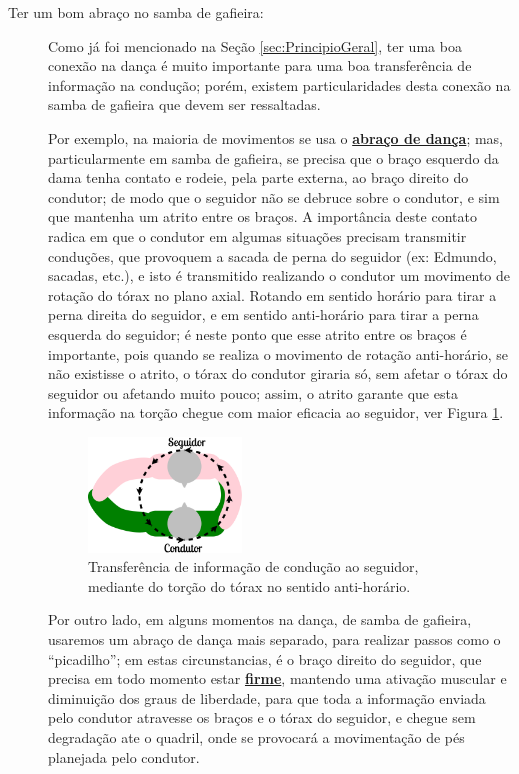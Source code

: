 \begin{description}
\item[Ter um bom abraço no samba de gafieira:] Como já foi mencionado na Seção \ref{sec:PrincipioGeral}, 
ter uma boa conexão na dança é muito importante para uma boa transferência de informação na condução; 
porém, existem particularidades desta conexão na samba de gafieira que devem ser ressaltadas.

Por exemplo, na maioria de movimentos se usa o \hyperref[def:abracodedanca]{\textbf{abraço de dança}};
mas, particularmente em samba de gafieira, se precisa que o braço esquerdo da dama tenha contato
e rodeie, pela parte externa, ao braço direito do condutor; 
de modo  que o seguidor não se debruce sobre o condutor,
e sim que mantenha um atrito entre os braços.
A importância deste contato radica em que o condutor em algumas situações precisam transmitir conduções, 
que provoquem a sacada de perna do seguidor (ex: Edmundo, sacadas, etc.), 
e isto é transmitido realizando o condutor um movimento de rotação do tórax no plano axial.  
Rotando em sentido horário para tirar a perna direita do seguidor, 
e em sentido anti-horário para tirar a perna esquerda do seguidor;
é neste ponto que esse atrito entre os braços é importante, 
pois quando se realiza o movimento de rotação anti-horário, se não existisse o atrito,
o tórax do condutor giraria só, sem afetar o tórax do seguidor ou afetando muito pouco;
assim, o atrito garante que esta informação na torção chegue com maior eficacia ao seguidor,
ver Figura \ref{fig:torcao-abraco}.
\begin{figure}[h]
  \centering
    \includegraphics[width=0.4\textwidth]{chapters/cap-normas/torcao-abraco.eps}
\caption{Transferência de informação de condução ao seguidor, mediante do torção do tórax no sentido anti-horário.}
\label{fig:torcao-abraco}
\end{figure}

Por outro lado, em alguns momentos na dança, de samba de gafieira, usaremos um abraço de dança mais separado,
para realizar passos como o ``picadilho''; em estas circunstancias, é o braço direito do seguidor,
que precisa em todo momento estar \hyperref[def:brazosfirmes]{\textbf{firme}}, 
mantendo uma ativação muscular e diminuição dos graus de liberdade,
para que toda a informação enviada pelo condutor atravesse os braços e o tórax do seguidor,
e chegue sem degradação ate o quadril, onde se provocará a movimentação de pés planejada pelo condutor.


\end{description}
